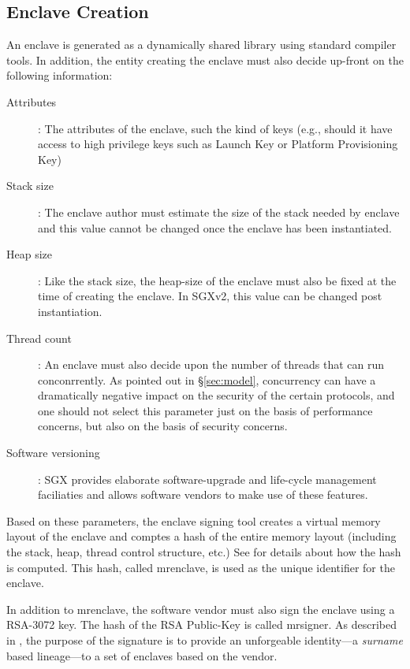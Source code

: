 \documentclass[11pt]{article}
\newcommand{\secref}[1]{\S\ref{#1}}
\newcommand{\mrenclave}{\textsf{mrenclave}}
\newcommand{\mrsigner}{\textsf{mrsigner}}
\begin{document}
  \subsection{Enclave Creation}
  An enclave is generated as a dynamically shared library using
  standard compiler tools. In addition, the entity creating the
  enclave must also decide up-front on the following information:

  \begin{description}
    \item[Attributes]: The attributes of the enclave, such the kind of keys (e.g.,
      should  it have access to high privilege keys such as Launch Key or Platform
      Provisioning Key)
    \item[Stack size]: The enclave author must estimate the size of the
      stack needed by enclave and this value cannot be changed once
      the enclave has been instantiated.
    \item[Heap size]: Like the stack size, the heap-size of the enclave
      must also be fixed at the time of creating the enclave. In
      SGXv2, this value can be changed post instantiation.
    \item[Thread count]: An enclave must also decide upon the number
      of threads that can run conconrrently. As pointed out in
      \secref{sec:model}, concurrency can have a dramatically negative
      impact on the security of the certain protocols, and one should
      not select this parameter just on the basis of performance
      concerns, but also on the basis of security concerns.
    \item[Software versioning]: SGX provides elaborate
      software-upgrade and life-cycle management faciliaties and
      allows software vendors to make use of these features.
  \end{description}
  Based on these parameters, the enclave signing  tool creates a
  virtual memory layout of the enclave and comptes a hash of the
  entire memory layout (including the stack, heap, thread control
  structure, etc.)  See \cite{intelsdm} for details
  about how the hash is computed. This hash, called
  \mrenclave, is used as the unique identifier for the enclave.

  In addition to \textsf{mrenclave}, the software vendor must
  also sign the enclave using a RSA-3072 key. The hash of the RSA
  Public-Key is called \mrsigner. As described in \cite{surnaming},
  the purpose of the signature is to provide an unforgeable
  identity---a \textit{surname} based lineage---to a set of enclaves
  based on the vendor.
\end{document}
